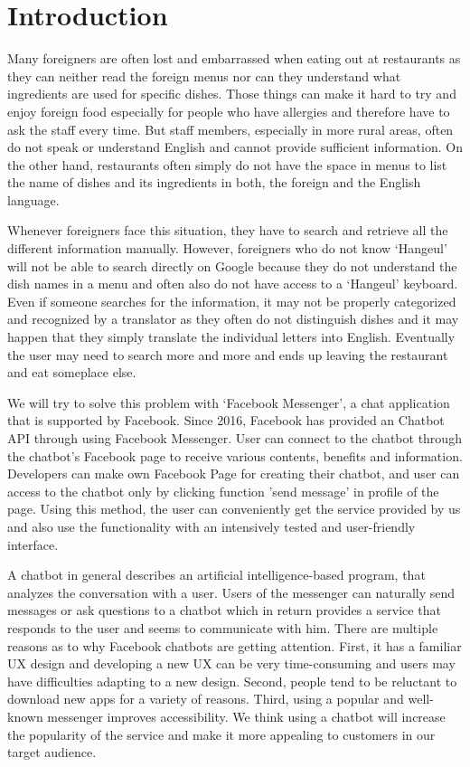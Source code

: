 \section{Introduction}
Many foreigners are often lost and embarrassed when eating out at restaurants as they can neither read the foreign menus nor can they understand what ingredients are used for specific dishes. Those things can make it hard to try and enjoy foreign food especially for people who have allergies and therefore have to ask the staff every time. But staff members, especially in more rural areas, often do not speak or understand English and cannot provide sufficient information. On the other hand, restaurants often simply do not have the space in menus to list the name of dishes and its ingredients in both, the foreign and the English language.

 Whenever foreigners face this situation, they have to search and retrieve all the different information manually. However, foreigners who do not know ‘Hangeul’ will not be able to search directly on Google because they do not understand the dish names in a menu and often also do not have access to a ‘Hangeul’ keyboard. Even if someone searches for the information, it may not be properly categorized and recognized by a translator as they often do not distinguish dishes and it may happen that they simply translate the individual letters into English. Eventually the user may need to search more and more and ends up leaving the restaurant and eat someplace else. 

 We will try to solve this problem with ‘Facebook Messenger’, a chat application that is supported by Facebook. Since 2016, Facebook has provided an Chatbot API through using Facebook Messenger. User can connect to the chatbot through the chatbot's Facebook page to receive various contents, benefits and information. Developers can make own Facebook Page for creating their chatbot, and user can access to the chatbot only by clicking function 'send message' in profile of the page. Using this method, the user can conveniently get the service provided by us and also use the functionality with an intensively tested and user-friendly interface.

 A chatbot in general describes an artificial intelligence-based program, that analyzes the conversation with a user. Users of the messenger can naturally send messages or ask questions to a chatbot which in return provides a service that responds to the user and seems to communicate with him. There are multiple reasons as to why Facebook chatbots are getting attention. First, it has a familiar UX design and developing a new UX can be very time-consuming and users may have difficulties adapting to a new design. Second, people tend to be reluctant to download new apps for a variety of reasons. Third, using a popular and well-known messenger improves accessibility. We think using a chatbot will increase the popularity of the service and make it more appealing to customers in our target audience. \newline

